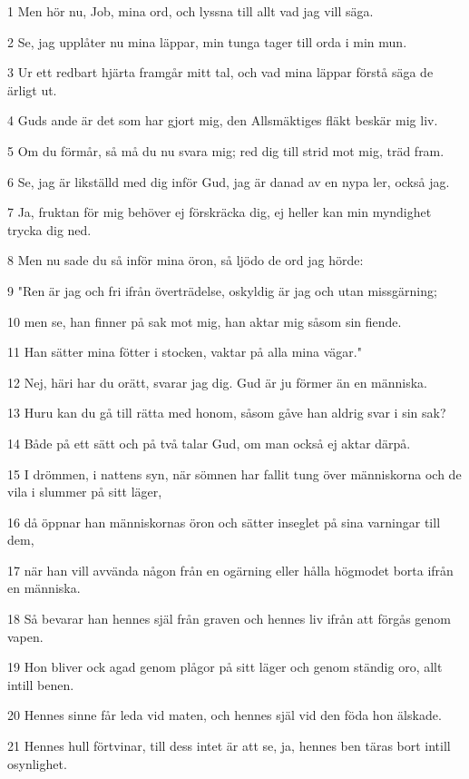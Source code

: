 \par 1 Men hör nu, Job, mina ord, och lyssna till allt vad jag vill säga.
\par 2 Se, jag upplåter nu mina läppar, min tunga tager till orda i min mun.
\par 3 Ur ett redbart hjärta framgår mitt tal, och vad mina läppar förstå säga de ärligt ut.
\par 4 Guds ande är det som har gjort mig, den Allsmäktiges fläkt beskär mig liv.
\par 5 Om du förmår, så må du nu svara mig; red dig till strid mot mig, träd fram.
\par 6 Se, jag är likställd med dig inför Gud, jag är danad av en nypa ler, också jag.
\par 7 Ja, fruktan för mig behöver ej förskräcka dig, ej heller kan min myndighet trycka dig ned.
\par 8 Men nu sade du så inför mina öron, så ljödo de ord jag hörde:
\par 9 "Ren är jag och fri ifrån överträdelse, oskyldig är jag och utan missgärning;
\par 10 men se, han finner på sak mot mig, han aktar mig såsom sin fiende.
\par 11 Han sätter mina fötter i stocken, vaktar på alla mina vägar."
\par 12 Nej, häri har du orätt, svarar jag dig. Gud är ju förmer än en människa.
\par 13 Huru kan du gå till rätta med honom, såsom gåve han aldrig svar i sin sak?
\par 14 Både på ett sätt och på två talar Gud, om man också ej aktar därpå.
\par 15 I drömmen, i nattens syn, när sömnen har fallit tung över människorna och de vila i slummer på sitt läger,
\par 16 då öppnar han människornas öron och sätter inseglet på sina varningar till dem,
\par 17 när han vill avvända någon från en ogärning eller hålla högmodet borta ifrån en människa.
\par 18 Så bevarar han hennes själ från graven och hennes liv ifrån att förgås genom vapen.
\par 19 Hon bliver ock agad genom plågor på sitt läger och genom ständig oro, allt intill benen.
\par 20 Hennes sinne får leda vid maten, och hennes själ vid den föda hon älskade.
\par 21 Hennes hull förtvinar, till dess intet är att se, ja, hennes ben täras bort intill osynlighet.
